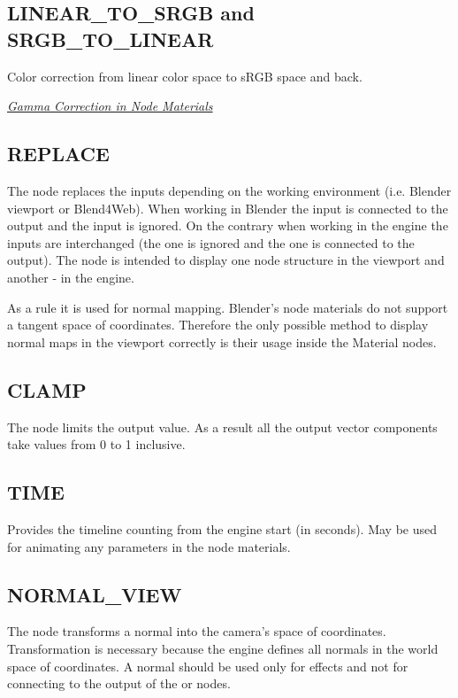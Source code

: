 \documentclass[a4paper,12pt,oneside]{sphinxmanual}
\begin{document}
\subsection{LINEAR\_TO\_SRGB and SRGB\_TO\_LINEAR}
\label{node_materials:linear-to-srgb-srgb-to-linear}
Color correction from linear color space to sRGB space and back.




{\hyperref[gamma_alpha:gamma-nodes]{\emph{Gamma Correction in Node Materials}}}




\subsection{REPLACE}
\label{node_materials:replace}
The node replaces the inputs depending on the working environment (i.e. Blender viewport or Blend4Web). When working in Blender the  input is connected to the  output and the  input is ignored. On the contrary when working in the engine the inputs are interchanged (the  one is ignored and the  one is connected to the output). The node is intended to display one node structure in the viewport and another - in the engine.

As a rule it is used for normal mapping. Blender's node materials do not support a tangent space of coordinates. Therefore the only possible method to display normal maps in the viewport correctly is their usage inside the Material nodes.


\subsection{CLAMP}
\label{node_materials:clamp}
The node limits the output value. As a result all the output vector components take values from 0 to 1 inclusive.


\subsection{TIME}
\label{node_materials:time}
Provides the timeline counting from the engine start (in seconds). May be used for animating any parameters in the node materials.


\subsection{NORMAL\_VIEW}
\label{node_materials:normal-view}
The node transforms a normal into the camera's space of coordinates. Transformation is necessary because the engine defines all normals in the world space of coordinates. A normal should be used only for effects and not for connecting to the output of the  or  nodes.
\end{document}
